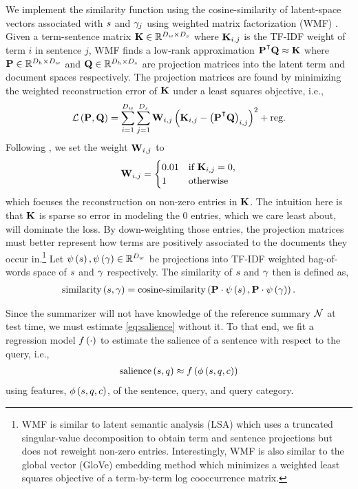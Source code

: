 We implement the similarity function using the cosine-similarity of
latent-space vectors associated with $s$ and $\gamma_j$ using weighted
matrix factorization (WMF) \citep{srebro2003,guo2012}. Given a term-sentence
matrix $\mathbf{K} \in \mathbb{R}^{{D_w} \times {D_s}}$ where $\mathbf{K}_{i,j}$ is the
TF-IDF weight of term $i$ in sentence $j$, WMF finds a low-rank approximation
$\wproj^\T\sproj \approx \tsmat$ where $\mathbf{P} \in \mathbb{R}^{{D_h} \times
{D_w}}$ and $\mathbf{Q} \in \mathbb{R}^{{D_h} \times {D_s}}$ are projection matrices
into the latent term and document  spaces respectively.  The projection
matrices are found by minimizing the weighted reconstruction error of $\mathbf{K}$
under a least squares objective, i.e.,
\[
    \obj{\wproj,\sproj} = 
      \sum_{i=1}^\sdimw \sum_{j=1}^\sdims
        \wmat_{i,j} \left( 
          \tsmat_{i,j} - \left(\wproj^\T\sproj\right)_{i,j}
        \right)^2 + \textrm{reg.}
\] 
Following \cite{guo2012}, we set the weight $\mathbf{W}_{i,j}$ to 
\[ 
    \mathbf{W}_{i,j} = \begin{cases} 
        0.01 & \textrm{if $\mathbf{K}_{i,j} = 0$,}\\
        1 & \textrm{otherwise}
   \end{cases}
\] 
which focuses the reconstruction on non-zero entries in $\mathbf{K}$. The intuition
here is that $\mathbf{K}$ is sparse so error in modeling the 0 entries, which we
care least about, will dominate the loss. By down-weighting those entries, the
projection matrices must better represent how terms are positively associated
to the documents they occur in.\footnote{WMF is similar to latent semantic
analysis (LSA) \citep{dumais1988} which uses a truncated singular-value
decomposition to obtain term and sentence projections but does not reweight
non-zero entries.  Interestingly, WMF is also similar to the global vector
(GloVe) embedding method \citep{pennington2014glove} which minimizes a weighted
least squares objective of a term-by-term log cooccurrence matrix.} Let
$\psi\left(s\right),\psi\left(\gamma\right) \in \mathbb{R}^{{D_w}}$ be projections into TF-IDF
weighted bag-of-words space of $s$ and $\gamma$ respectively. The
similarity of $s$ and $\gamma$ then is defined as, 
\begin{align}
\operatorname{similarity}\left(s,\gamma\right) =
\operatorname{cosine-similarity}\left(\mathbf{P} \cdot \psi\left(s\right), \mathbf{P} \cdot \psi\left(\gamma\right)\right). 
\label{eq:semsim} 
\end{align}

Since the summarizer will not have knowledge of the reference summary
$\mathcal{N}$ at test time, we must estimate \autoref{eq:salience} without it.
To that end, we fit a regression model $f\left(\cdot\right)$ to estimate the
salience of a sentence with respect to the query, i.e., 
\begin{align}
\operatorname{salience}\left(s, q\right) \approx f\left(\phi\left(s,q,c\right)\right)
\label{eq:approxsal} 
\end{align} 
using features, $\phi\left(s,q,c\right)$, of the sentence, query, and
query category.

